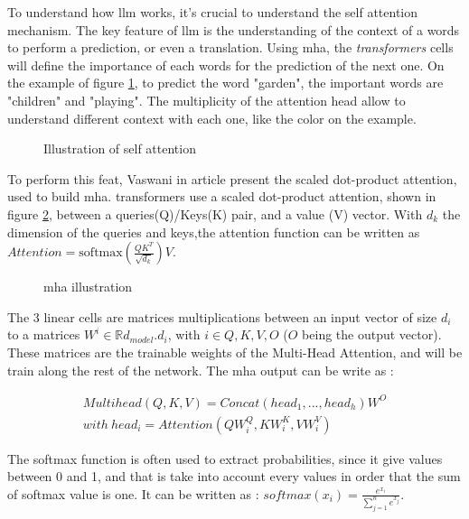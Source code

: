 To understand how \acrshort{llm} works, it's crucial to understand the self attention mechanism. The key feature of \acrshort{llm} is the understanding of the context of a words to perform a prediction, or even a translation. Using \acrfull{mha}, the \textit{transformers} cells will define the importance of each words for the prediction of the next one. On the example of figure \ref{fig:self_att}, to predict the word "garden", the important words are "children" and "playing". The multiplicity of the attention head allow to understand different context with each one, like the color on the example. 

\begin{figure}[h]
    \centering
    
    \caption{Illustration of self attention}
    \label{fig:self_att}
\end{figure}


To perform this feat, Vaswani in article \cite{vaswani_attention_2017} present the scaled dot-product attention, used to build \acrshort{mha}. \Glspl{transformer} use a scaled dot-product attention, shown in figure \ref{fig:mha}, between a queries(Q)/Keys(K) pair, and a value (V) vector. With $d_k$ the dimension of the queries and keys,the attention function can be written as $Attention = \text{softmax} ( \frac{Q K^T}{\sqrt{d_k}})V$.

\begin{figure}[h]
    \centering
    
    \caption{\acrfull{mha} illustration }
    \label{fig:mha}
\end{figure}

The 3 linear cells are matrices multiplications between an input vector of size $d_i$ to a matrices $W^i \in \mathbb{R}{d_{model} . d_i}$, with $i \in {Q,K,V,O}$ ($O$ being the output vector). These matrices are the trainable weights of the Multi-Head Attention, and will be train along the rest of the network. The \acrshort{mha} output can be write as : 

\begin{equation}
\begin{split}
 Multihead (Q,K,V) = Concat (head_1,...,head_h)W^O\\
with \ head_i = Attention (Q W_i^Q,K W_i^K,V W_i^V)
\end{split}
\label{eq : MHA}  
\end{equation}

The softmax function is often used to extract probabilities, since it give values between 0 and 1, and that is take into account every values in order that the sum of softmax value is one. It can be written as : $\displaystyle
softmax(x_i) = \frac{e^{x_i}}{\sum_{j=1}^n e^{x_j}}$.

